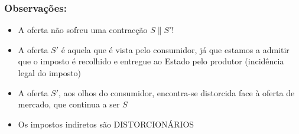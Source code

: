 \begin{frame}
	\frametitle{Observa\c c\~oes:}
	\begin{itemize}
		\item A oferta n\~ao sofreu uma contrac\c c\~ao $S\parallel S'$!
		\item<2-> A oferta $S'$ \'e aquela que \'e vista pelo consumidor, j\'a que estamos a admitir que o imposto \'e recolhido e entregue ao Estado pelo produtor (incid\^encia legal do imposto)
		\item<3-> A oferta $S'$, aos olhos do consumidor, encontra-se distorcida face \`a oferta de mercado, que continua a ser $S$
		\item <4-> Os impostos indiretos s\~ao DISTORCION\'ARIOS
	\end{itemize}
\end{frame}

